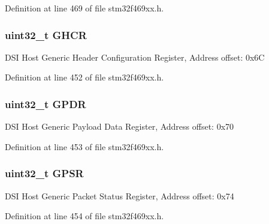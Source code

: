 Definition at line 469 of file stm32f469xx.\+h.

\subsubsection[{\texorpdfstring{G\+H\+CR}{GHCR}}]{ uint32\+\_\+t G\+H\+CR}\hypertarget{struct_d_s_i___type_def_aa3607a56076e3621468a0f89c1551e99}{}\label{struct_d_s_i___type_def_aa3607a56076e3621468a0f89c1551e99}
D\+SI Host Generic Header Configuration Register, Address offset\+: 0x6C 

Definition at line 452 of file stm32f469xx.\+h.

\subsubsection[{\texorpdfstring{G\+P\+DR}{GPDR}}]{ uint32\+\_\+t G\+P\+DR}\hypertarget{struct_d_s_i___type_def_a8ed572f0779c735318463aa01dca3322}{}\label{struct_d_s_i___type_def_a8ed572f0779c735318463aa01dca3322}
D\+SI Host Generic Payload Data Register, Address offset\+: 0x70 

Definition at line 453 of file stm32f469xx.\+h.

\subsubsection[{\texorpdfstring{G\+P\+SR}{GPSR}}]{ uint32\+\_\+t G\+P\+SR}\hypertarget{struct_d_s_i___type_def_ad1d17a2648bfc75d9ce470ddcb97f8ff}{}\label{struct_d_s_i___type_def_ad1d17a2648bfc75d9ce470ddcb97f8ff}
D\+SI Host Generic Packet Status Register, Address offset\+: 0x74 

Definition at line 454 of file stm32f469xx.\+h.

